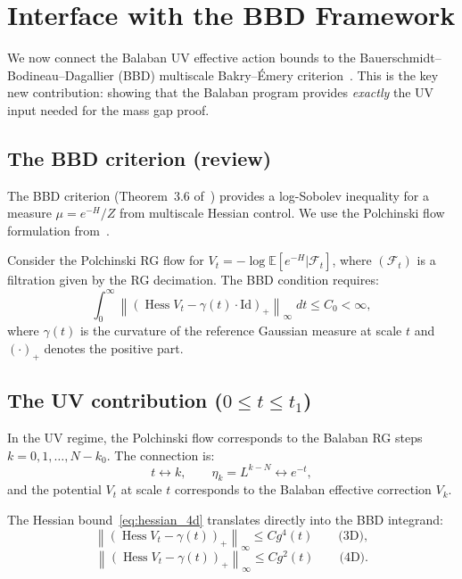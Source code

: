 \documentclass[11pt,a4paper]{article}
\theoremstyle{plain}
\theoremstyle{definition}
\theoremstyle{remark}
\newcommand{\E}{\mathbb{E}}
\newcommand{\Hess}{\operatorname{Hess}}
\newcommand{\cF}{\mathcal{F}}
\begin{document}
\section{Interface with the BBD Framework}
\label{sec:bbd_interface}

We now connect the Balaban UV effective action bounds
to the Bauerschmidt--Bodineau--Dagallier (BBD)
multiscale Bakry--\'Emery criterion~\cite{BBD24}.
This is the key new contribution: showing that the
Balaban program provides \emph{exactly} the UV input
needed for the mass gap proof.

\subsection{The BBD criterion (review)}

The BBD criterion (Theorem~3.6 of~\cite{BBD24})
provides a log-Sobolev inequality for a measure
$\mu = e^{-H} / Z$ from multiscale Hessian control.
We use the Polchinski flow formulation from~\cite{FontesBBD}.

Consider the Polchinski RG flow for
$V_t = -\log \E[e^{-H}|\cF_t]$, where $(\cF_t)$
is a filtration given by the RG decimation.
The BBD condition requires:
\begin{equation}\label{eq:bbd}
  \int_0^\infty \left\|
  \left(\Hess V_t - \gamma(t) \cdot \text{Id}
  \right)_+\right\|_\infty \; dt \le C_0 < \infty,
\end{equation}
where $\gamma(t)$ is the curvature of the reference
Gaussian measure at scale $t$ and $(\cdot)_+$
denotes the positive part.

\subsection{The UV contribution ($0 \le t \le t_1$)}

In the UV regime, the Polchinski flow corresponds
to the Balaban RG steps $k = 0, 1, \ldots, N - k_0$.
The connection is:
\begin{equation}
  t \leftrightarrow k, \qquad
  \eta_k = L^{k-N} \leftrightarrow e^{-t},
\end{equation}
and the potential $V_t$ at scale $t$ corresponds
to the Balaban effective correction $V_k$.

The Hessian bound~\eqref{eq:hessian_4d}
translates directly into the BBD integrand:
\begin{equation}\label{eq:uv_bbd}
  \left\|(\Hess V_t - \gamma(t))_+\right\|_\infty
  \le C g^4(t) \qquad \text{(3D)},
\end{equation}
\begin{equation}\label{eq:uv_bbd_4d}
  \left\|(\Hess V_t - \gamma(t))_+\right\|_\infty
  \le C g^2(t) \qquad \text{(4D)}.
\end{equation}
\end{document}
